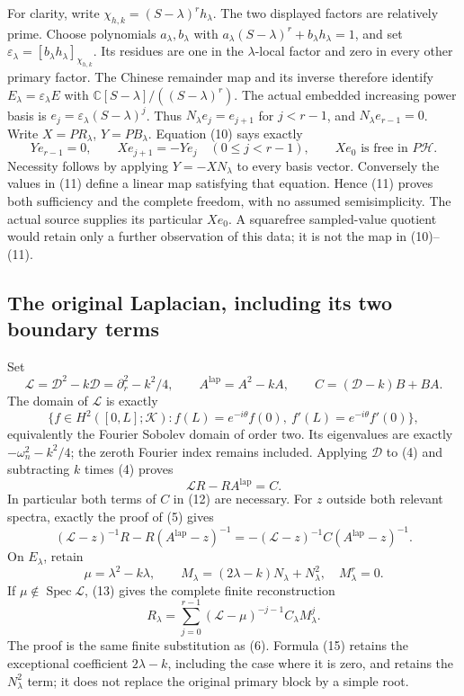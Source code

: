 \documentclass[10pt,a4paper,oneside]{report}
\begin{document}
For clarity, write \(\chi_{h,k}=(S-\lambda)^r h_\lambda\).
The two displayed factors are relatively prime. Choose polynomials
\(a_\lambda,b_\lambda\) with
\(a_\lambda(S-\lambda)^r+b_\lambda h_\lambda=1\), and set
\(\varepsilon_\lambda=[b_\lambda h_\lambda]_{\chi_{h,k}}\).
Its residues are one in the \(\lambda\)-local factor and zero in
every other primary factor. The Chinese remainder map and its
inverse therefore identify \(E_\lambda=\varepsilon_\lambda E\)
with \(\mathbb C[S-\lambda]/((S-\lambda)^r)\).
The actual embedded increasing power basis is
\(e_j=\varepsilon_\lambda(S-\lambda)^j\). Thus
\(N_\lambda e_j=e_{j+1}\) for \(j<r-1\), and
\(N_\lambda e_{r-1}=0\). Write \(X=PR_\lambda\),
\(Y=PB_\lambda\). Equation (10) says exactly
\[
 Ye_{r-1}=0,\qquad
 Xe_{j+1}=-Ye_j\quad(0\le j<r-1),\qquad
 Xe_0\text{ is free in }P\mathscr H.
 \tag{11}
\]
Necessity follows by applying \(Y=-XN_\lambda\) to every basis
vector. Conversely the values in (11) define a linear map satisfying
that equation. Hence (11) proves both sufficiency and the complete
freedom, with no assumed semisimplicity. The actual source supplies
its particular \(Xe_0\). A squarefree sampled-value quotient would
retain only a further observation of this data; it is not the map
in (10)--(11).

\subsection{The original Laplacian, including its two boundary terms}
Set
\[
 \mathscr L=\mathscr D^2-k\mathscr D
 =\partial_r^2-k^2/4,
 \qquad A^{\mathrm{lap}}=A^2-kA,
 \qquad C=(\mathscr D-k)B+BA.
 \tag{12}
\]
The domain of \(\mathscr L\) is exactly
\[
 \{f\in H^2([0,L];\mathcal K):
 f(L)=e^{-i\theta}f(0),\ f'(L)=e^{-i\theta}f'(0)\},
\]
equivalently the Fourier Sobolev domain of order two.
Its eigenvalues are exactly \(-\omega_n^2-k^2/4\); the zeroth
Fourier index remains included. Applying \(\mathscr D\) to (4)
and subtracting \(k\) times (4) proves
\[
 \mathscr L R-RA^{\mathrm{lap}}=C.
 \tag{13}
\]
In particular both terms of \(C\) in (12) are necessary.
For \(z\) outside both relevant spectra, exactly the proof of (5)
gives
\[
 (\mathscr L-z)^{-1}R-R(A^{\mathrm{lap}}-z)^{-1}
 =-(\mathscr L-z)^{-1}C(A^{\mathrm{lap}}-z)^{-1}.
 \tag{14}
\]
On \(E_\lambda\), retain
\[
 \mu=\lambda^2-k\lambda,\qquad
 M_\lambda=(2\lambda-k)N_\lambda+N_\lambda^2,
 \quad M_\lambda^r=0.
 \tag{15}
\]
If \(\mu\notin\operatorname{Spec}\mathscr L\), (13) gives the
complete finite reconstruction
\[
 R_\lambda=\sum_{j=0}^{r-1}
       (\mathscr L-\mu)^{-j-1}C_\lambda M_\lambda^j.
 \tag{16}
\]
The proof is the same finite substitution as (6). Formula (15)
retains the exceptional coefficient \(2\lambda-k\), including
the case where it is zero, and retains the \(N_\lambda^2\) term;
it does not replace the original primary block by a simple root.
\end{document}
